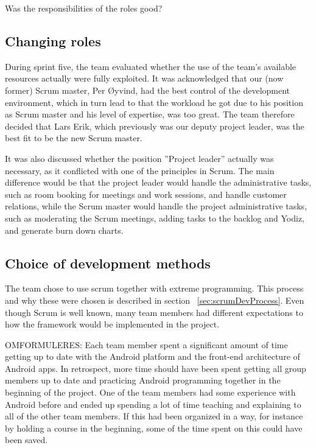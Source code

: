 Was the responsibilities of the roles good?

\subsection{Changing roles}
\label{sec:unbalancedWorkload}
During sprint five, the team evaluated whether the use of the team's available resources actually were fully exploited. It was acknowledged that our (now former) Scrum master, Per Øyvind, had the best control of the development environment, which in turn lead to that the workload he got due to his position as Scrum master and his level of expertise, was too great. The team therefore decided that Lars Erik, which previously was our deputy project leader, was the best fit to be the new Scrum master.

It was also discussed whether the position ''Project leader'' actually was necessary, as it conflicted with one of the principles in Scrum.  The main difference would be that the project leader would handle the administrative tasks, such as room booking for meetings and work sessions, and handle customer relations, while the Scrum master would handle the project administrative tasks, such as moderating the Scrum meetings, adding tasks to the backlog and Yodiz, and generate burn down charts.

\subsection{Choice of development methods}

The team chose to use scrum together with extreme programming. This process and why these were chosen is described in section ~\ref{sec:scrumDevProcess}. Even though Scrum is well known, many team members had different expectations to how the framework would be implemented in the project.


OMFORMULERES: Each team member spent a significant amount of time getting up to date with the Android platform and the front-end architecture of Android apps. In retrospect, more time should have been spent getting all group members up to date and practicing Android programming together in the beginning of the project. One of the team members had some experience with Android before and ended up spending a lot of time teaching and explaining to all of the other team members. If this had been organized in a way, for instance by holding a course in the beginning, some of the time spent on this could have been saved. 

